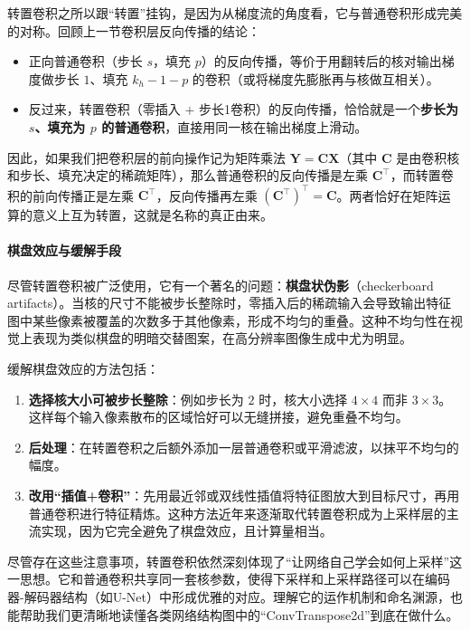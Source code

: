 转置卷积之所以跟“转置”挂钩，是因为从梯度流的角度看，它与普通卷积形成完美的对称。回顾上一节卷积层反向传播的结论：
\begin{itemize}
    \item 正向普通卷积（步长 $s$，填充 $p$）的反向传播，等价于用翻转后的核对输出梯度做步长 $1$、填充 $k_h-1-p$ 的卷积（或将梯度先膨胀再与核做互相关）。
    \item 反过来，转置卷积（零插入 $+$ 步长1卷积）的反向传播，恰恰就是一个\textbf{步长为 $s$、填充为 $p$ 的普通卷积}，直接用同一核在输出梯度上滑动。
\end{itemize}
因此，如果我们把卷积层的前向操作记为矩阵乘法 $\mathbf{Y} = \mathbf{C}\mathbf{X}$（其中 $\mathbf{C}$ 是由卷积核和步长、填充决定的稀疏矩阵），那么普通卷积的反向传播是左乘 $\mathbf{C}^\top$，而转置卷积的前向传播正是左乘 $\mathbf{C}^\top$，反向传播再左乘 $(\mathbf{C}^\top)^\top = \mathbf{C}$。两者恰好在矩阵运算的意义上互为转置，这就是名称的真正由来\cite{dumoulin2018guideconvolutionarithmeticdeep}。

\paragraph{棋盘效应与缓解手段}

尽管转置卷积被广泛使用，它有一个著名的问题：\textbf{棋盘状伪影}（checkerboard artifacts）。当核的尺寸不能被步长整除时，零插入后的稀疏输入会导致输出特征图中某些像素被覆盖的次数多于其他像素，形成不均匀的重叠。这种不均匀性在视觉上表现为类似棋盘的明暗交替图案，在高分辨率图像生成中尤为明显\cite{2016Deconvolution}。

缓解棋盘效应的方法包括：
\begin{enumerate}
    \item \textbf{选择核大小可被步长整除}：例如步长为 $2$ 时，核大小选择 $4\times4$ 而非 $3\times3$。这样每个输入像素散布的区域恰好可以无缝拼接，避免重叠不均匀。
    \item \textbf{后处理}：在转置卷积之后额外添加一层普通卷积或平滑滤波，以抹平不均匀的幅度。
    \item \textbf{改用“插值+卷积”}：先用最近邻或双线性插值将特征图放大到目标尺寸，再用普通卷积进行特征精炼。这种方法近年来逐渐取代转置卷积成为上采样层的主流实现，因为它完全避免了棋盘效应，且计算量相当。
\end{enumerate}

尽管存在这些注意事项，转置卷积依然深刻体现了“让网络自己学会如何上采样”这一思想。它和普通卷积共享同一套核参数，使得下采样和上采样路径可以在编码器-解码器结构（如U-Net\cite{ronneberger2015unetconvolutionalnetworksbiomedical}）中形成优雅的对应。理解它的运作机制和命名渊源，也能帮助我们更清晰地读懂各类网络结构图中的“ConvTranspose2d”到底在做什么。

